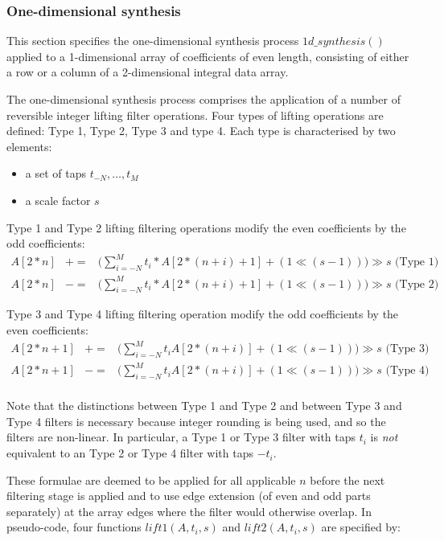\subsubsection{One-dimensional synthesis}
\label{onedsynth}

This section specifies the one-dimensional synthesis process
$1d\_synthesis()$ applied to a 1-dimensional array of coefficients of
even length, consisting
of either a row or a column of a 2-dimensional integral data array.

The one-dimensional synthesis process comprises the application of a
number of reversible integer lifting filter operations. Four types 
of lifting operations are defined: Type 1, Type 2, Type 3 and type 4.
Each type is characterised by two elements:
\begin{itemize}
\item a set of taps $t_{-N}, \hdots,t_M$
\item a scale factor $s$
\end{itemize}

Type 1 and Type 2 lifting filtering operations modify the even coefficients
by the odd coefficients:
\begin{eqnarray*}
  A[2*n]& +=& \big( \sum^M_{i=-N} t_i *A[2*(n+i) + 1] +(1\ll (s-1))\big) \gg s \mbox{ (Type 1)} \\
  A[2*n]& -=& \big( \sum^M_{i=-N} t_i *A[2*(n+i) + 1] +(1\ll (s-1))\big) \gg s \mbox{ (Type 2)}
\end{eqnarray*}

Type 3 and Type 4 lifting filtering operation modify the odd coefficients
 by the even coefficients:
\begin{eqnarray*}
  A[2*n+1]& +=&  \big( \sum^M_{i=-N} t_i A[2*(n+i)]+(1\ll (s-1)) \big) \gg s \mbox{ (Type 3)} \\
  A[2*n+1]& -=&  \big( \sum^M_{i=-N} t_i A[2*(n+i)] +(1\ll (s-1))\big) \gg s \mbox{ (Type 4)} \\
\end{eqnarray*}

\begin{informative}
Note that the distinctions between Type 1 and Type 2 and between 
Type 3 and Type 4 filters is necessary
because integer rounding is being used, and so the filters are non-linear.
In particular, a Type 1 or Type 3 filter with taps $t_i$ is {\em not} equivalent to 
an Type 2 or Type 4 filter with taps $-t_i$.
\end{informative}

These formulae are deemed to be applied for all applicable $n$
before the next filtering stage is applied and to use edge extension (of even and
odd parts separately) at the array
edges where the filter would otherwise overlap. In pseudo-code, four
functions $lift1(A, t_i, s)$ and $lift2(A, t_i, s)$ are specified by:

